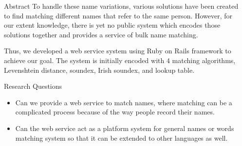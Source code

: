 \documentclass[final]{beamer}
\newlength{\sepwid}
\newlength{\onecolwid}
\begin{document}
\begin{frame}[t]
\begin{columns}[t]
\begin{column}{\onecolwid}
\begin{block}{Abstract}
To handle these name variations, various solutions have been created to find
matching different names that refer to the same person. However,
for our extent knowledge, there is yet no public system which encodes
those solutions together and provides a service of bulk name matching.

Thus, we developed a web service system using Ruby on Rails framework
to achieve our goal. The system is initially encoded with 4 matching algorithms,
Levenshtein distance, soundex, Irish soundex, and lookup table.



\end{block}

\begin{alertblock}{Research Questions}

\begin{itemize}
\item Can we provide a web service to match names, where matching can be
      a complicated process because of the way people record their names.
\item Can the web service act as a platform system for general names or words
      matching system so that it can be extended to other languages as well.
\end{itemize}

\end{alertblock}


\end{column}

\begin{column}{\sepwid}\end{column}

%
%
%
%
%
%


\end{columns}
\end{frame}
\end{document}
